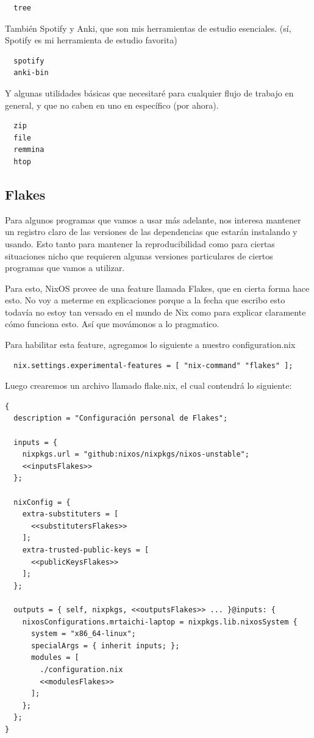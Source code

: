 \documentclass[11pt]{article}
\begin{document}
\begin{verbatim}
  tree
\end{verbatim}

También Spotify y Anki, que son mis herramientas de estudio esenciales. (sí, Spotify es mi herramienta de estudio favorita)

\begin{verbatim}
  spotify
  anki-bin
\end{verbatim}

Y algunas utilidades básicas que necesitaré para cualquier flujo de trabajo en general, y que no caben en uno en específico (por ahora).

\begin{verbatim}
  zip
  file
  remmina
  htop
\end{verbatim}
\subsection{Flakes}
\label{sec:org760dcff}

Para algunos programas que vamos a usar más adelante, nos interesa mantener un registro claro de las versiones de las dependencias que estarán instalando y usando. Esto tanto para mantener la reproducibilidad como para ciertas situaciones nicho que requieren algunas versiones particulares de ciertos programas que vamos a utilizar.

Para esto, NixOS provee de una feature llamada Flakes, que en cierta forma hace esto. No voy a meterme en explicaciones porque a la fecha que escribo esto todavía no estoy tan versado en el mundo de Nix como para explicar claramente cómo funciona esto. Así que movámonos a lo pragmatico.

Para habilitar esta feature, agregamos lo siguiente a nuestro configuration.nix

\begin{verbatim}
  nix.settings.experimental-features = [ "nix-command" "flakes" ];
\end{verbatim}

Luego crearemos un archivo llamado flake.nix, el cual contendrá lo siguiente:

\begin{verbatim}
{
  description = "Configuración personal de Flakes";

  inputs = {
    nixpkgs.url = "github:nixos/nixpkgs/nixos-unstable";
    <<inputsFlakes>>
  };

  nixConfig = {
    extra-substituters = [
      <<substitutersFlakes>>
    ];
    extra-trusted-public-keys = [
      <<publicKeysFlakes>>
    ];
  };

  outputs = { self, nixpkgs, <<outputsFlakes>> ... }@inputs: {
    nixosConfigurations.mrtaichi-laptop = nixpkgs.lib.nixosSystem {
      system = "x86_64-linux";
      specialArgs = { inherit inputs; };
      modules = [
        ./configuration.nix
        <<modulesFlakes>>
      ];
    };
  };
}
\end{verbatim}
\end{document}
